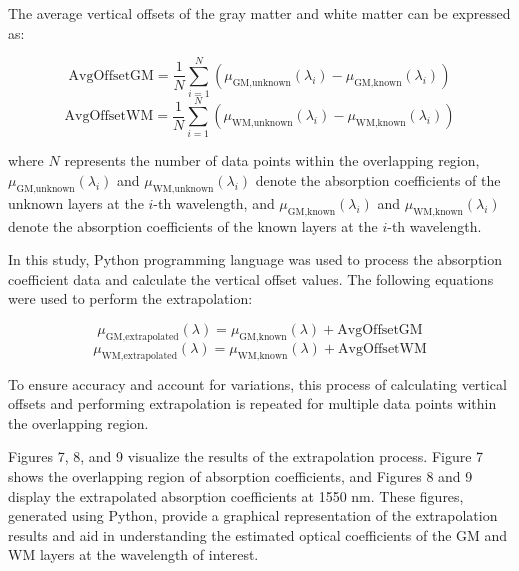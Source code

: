 \documentclass[journal,twoside,web]{ieeecolor}
\begin{document}
The average vertical offsets of the gray matter and white matter can be expressed as:

$$
\text{AvgOffsetGM} = \frac{1}{N} \sum_{i=1}^{N} (\mu_{\text{GM,unknown}}(\lambda_i) - \mu_{\text{GM,known}}(\lambda_i))
$$
$$
\text{AvgOffsetWM} = \frac{1}{N} \sum_{i=1}^{N} (\mu_{\text{WM,unknown}}(\lambda_i) - \mu_{\text{WM,known}}(\lambda_i))
$$

where \( N \) represents the number of data points within the overlapping region, \( \mu_{\text{GM,unknown}}(\lambda_i) \) and \( \mu_{\text{WM,unknown}}(\lambda_i) \) denote the absorption coefficients of the unknown layers at the \( i \)-th wavelength, and \( \mu_{\text{GM,known}}(\lambda_i) \) and \( \mu_{\text{WM,known}}(\lambda_i) \) denote the absorption coefficients of the known layers at the \( i \)-th wavelength.

In this study, Python programming language was used to process the absorption coefficient data and calculate the vertical offset values. The following equations were used to perform the extrapolation:

\[
\mu_{\text{GM,extrapolated}}(\lambda) = \mu_{\text{GM,known}}(\lambda) + \text{AvgOffsetGM}
\]
\[
\mu_{\text{WM,extrapolated}}(\lambda) = \mu_{\text{WM,known}}(\lambda) + \text{AvgOffsetWM}
\]

To ensure accuracy and account for variations, this process of calculating vertical offsets and performing extrapolation is repeated for multiple data points within the overlapping region.

Figures 7, 8, and 9 visualize the results of the extrapolation process. Figure 7 shows the overlapping region of absorption coefficients, and Figures 8 and 9 display the extrapolated absorption coefficients at 1550 nm. These figures, generated using Python, provide a graphical representation of the extrapolation results and aid in understanding the estimated optical coefficients of the GM and WM layers at the wavelength of interest.



\end{document}
